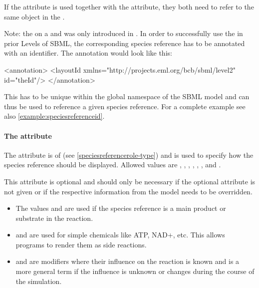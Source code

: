 If the  attribute is used together with the
 attribute, they both need to refer to the same object
in the \Model.

Note: the  on a \SpeciesReference and 
\ModifierSpeciesReference was only introduced in \sbmlthreecore.  In 
order to successfully use the  in prior Levels 
of SBML, the corresponding species reference has to be annotated with an 
identifier. The annotation would look like this: 

\begin{example}
<annotation>
    <layoutId xmlns="http://projects.eml.org/bcb/sbml/level2" id="theId"/>
</annotation>
\end{example}

This  has to be unique within the global  
namespace of the SBML model and can thus be used to reference a given 
species reference. For a complete example see also 
\ref{example:speciesreferenceid}. 

\paragraph{The  attribute}
\label{attribute:role}
The  attribute is of  
(see \ref{speciesreferencerole-type}) and is 
used to specify how the species reference should be displayed. Allowed 
values are , , , 
, , , 
 and . 

This attribute is optional and should only be necessary if the optional 
 attribute is not given or if the respective 
information from the model needs to be overridden. 

\begin{itemize}

	\item The values  and  are used if 
	the species reference is a main product or substrate in the reaction.

	\item {} and  are used for 
	simple chemicals like ATP, NAD+, etc. This allows programs to render 
	them as side reactions.

        \item {} and 
	 are modifiers where their influence on the reaction is 
	known and  is a more general term if the influence is 
	unknown or changes during the course of the simulation.

\end{itemize}

